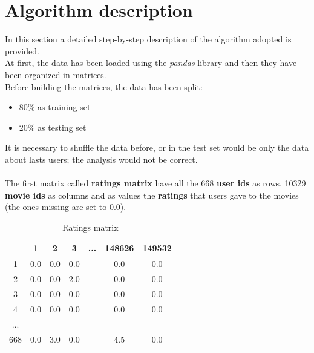 \documentclass{article}
\begin{document}
\newpage

\section{Algorithm description}
In this section a detailed step-by-step description of the algorithm adopted is provided.\\
At first, the data has been loaded using the \textsl{pandas} library and then they have been organized in matrices.\\
Before building the matrices, the data has been split:
\begin{itemize}
      \item 80\% as training set
      \item 20\% as testing set
\end{itemize}
It is necessary to shuffle the data before, or in the test set would be only the data about lasts users; the analysis would not be correct.\\ \\
The first matrix called \textbf{ratings matrix} have all the 668 \textbf{user ids} as rows, 10329 \textbf{movie ids} as columns and as values the \textbf{ratings} that users gave to the movies (the ones missing are set to 0.0).\\
\begin{table}[ht]
      \begin{center}
            \begin{tabular}{ | c | c | c | c | c | c | c |} 
              \hline
              \rowcolor{lightgray}  & 1 & 2 & 3 & ... & 148626 & 149532 \\ 
              \hline
               \cellcolor{lightgray}1 & 0.0 & 0.0 & 0.0 &  & 0.0 & 0.0 \\ 
              \hline
              \cellcolor{lightgray}2 & 0.0 & 0.0 & 2.0 &  & 0.0 & 0.0 \\ 
              \hline
              \cellcolor{lightgray}3 & 0.0 & 0.0 & 0.0 &  & 0.0 & 0.0\\
              \hline
              \cellcolor{lightgray}4 & 0.0 & 0.0 & 0.0 &  & 0.0 & 0.0\\
              \hline
              \cellcolor{lightgray}... &  &  &  &  &  & \\ 
              \hline
              \cellcolor{lightgray}668 & 0.0 & 3.0 & 0.0 &  & 4.5 & 0.0\\
              \hline
            \end{tabular}
            \caption{Ratings matrix}
            \label{tab: Ratings matrix}
      \end{center}
\end{table}
\end{document}
